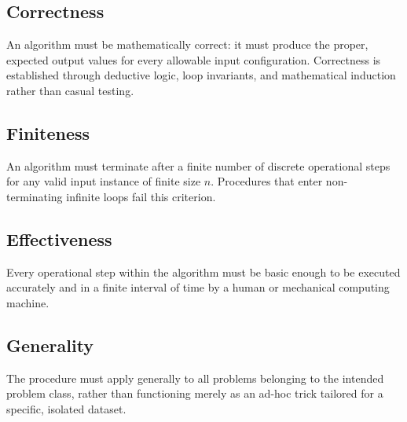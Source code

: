 \subsection{Correctness}
\begin{property}[Correctness]
An algorithm must be mathematically correct: it must produce the proper, expected output values for every allowable input configuration. Correctness is established through deductive logic, loop invariants, and mathematical induction rather than casual testing.
\end{property}

\subsection{Finiteness}
\begin{property}[Finiteness]
An algorithm must terminate after a finite number of discrete operational steps for any valid input instance of finite size $n$. Procedures that enter non-terminating infinite loops fail this criterion.
\end{property}

\subsection{Effectiveness}
\begin{property}[Effectiveness]
Every operational step within the algorithm must be basic enough to be executed accurately and in a finite interval of time by a human or mechanical computing machine.
\end{property}

\subsection{Generality}
\begin{property}[Generality]
The procedure must apply generally to all problems belonging to the intended problem class, rather than functioning merely as an ad-hoc trick tailored for a specific, isolated dataset.
\end{property}

